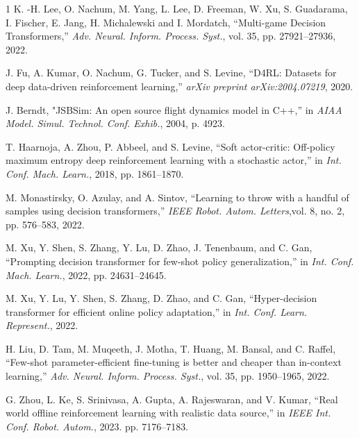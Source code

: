 \begin{thebibliography}{1}
    K. -H. Lee, O. Nachum, M. Yang, L. Lee, D. Freeman, W. Xu, S. Guadarama, I. Fischer, E. Jang, H. Michalewski and I. Mordatch, ``Multi-game Decision Transformers,'' \emph{Adv. Neural. Inform. Process. Syst.}, vol. 35, pp. 27921--27936, 2022.

    J. Fu, A. Kumar, O. Nachum, G. Tucker, and S. Levine, ``{D4RL}: Datasets for deep data-driven reinforcement learning,'' \emph{arXiv preprint arXiv:2004.07219}, 2020.

    J. Berndt, "{JSBSim}: An open source flight dynamics model in {C}++,'' in \emph{AIAA Model. Simul. Technol. Conf. Exhib.}, 2004, p. 4923.

    T. Haarnoja, A. Zhou, P. Abbeel, and S. Levine, ``Soft actor-critic: Off-policy maximum entropy deep reinforcement learning with a stochastic actor,'' in \emph{Int. Conf. Mach. Learn.}, 2018, pp. 1861--1870.

    M. Monastirsky, O. Azulay, and A. Sintov, ``Learning to throw with a handful of samples using decision transformers,'' \emph{IEEE Robot. Autom. Letters},vol. 8, no. 2, pp. 576--583, 2022.

    M. Xu, Y. Shen, S. Zhang, Y. Lu, D. Zhao, J. Tenenbaum, and C. Gan, ``Prompting decision transformer for few-shot policy generalization,'' in \emph{Int. Conf. Mach. Learn.}, 2022, pp. 24631--24645.

    M. Xu, Y. Lu, Y. Shen, S. Zhang, D. Zhao, and C. Gan, ``Hyper-decision transformer for efficient online policy adaptation,'' in \emph{Int. Conf. Learn. Represent.}, 2022.

    H. Liu, D. Tam, M. Muqeeth, J. Motha, T. Huang, M. Bansal, and C. Raffel, ``Few-shot parameter-efficient fine-tuning is better and cheaper than in-context learning,'' \emph{Adv. Neural. Inform. Process. Syst.}, vol. 35, pp. 1950--1965, 2022.

    G. Zhou, L. Ke, S. Srinivasa, A. Gupta, A. Rajeswaran, and V. Kumar, ``Real world offline reinforcement learning with realistic data source,'' in \emph{IEEE Int. Conf. Robot. Autom.}, 2023. pp. 7176--7183.
    
\end{thebibliography}
